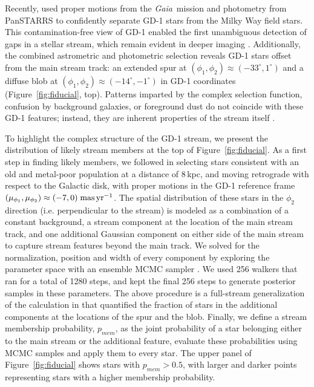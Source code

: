 \documentclass[twocolumn]{aastex62}
\newcommand{\gaia}{\textsl{Gaia}}
\begin{document}
Recently, \citet{pwb} used proper motions from the \gaia\ mission \citep{gdr2} and photometry from PanSTARRS \citep{ps} to confidently separate GD-1 stars from the Milky Way field stars.
This contamination-free view of GD-1 enabled the first unambiguous detection of gaps in a stellar stream, which remain evident in deeper imaging \citep{deboer2018}.
Additionally, the combined astrometric and photometric selection reveals GD-1 stars offset from the main stream track: an extended spur at $(\phi_1, \phi_2)\approx(-33^\circ,1^\circ)$ and a diffuse blob at $(\phi_1, \phi_2)\approx(-14^\circ,-1^\circ)$ in GD-1 coordinates (Figure~\ref{fig:fiducial}, top).
Patterns imparted by the complex selection function, confusion by background galaxies, or foreground dust do not coincide with these GD-1 features; instead, they are inherent properties of the stream itself \citep{pwb}.

To highlight the complex structure of the GD-1 stream, we present the distribution of likely stream members at the top of Figure~\ref{fig:fiducial}.
As a first step in finding likely members, we followed \citet{pwb} in selecting stars consistent with an old and metal-poor population at a distance of 8\,kpc, and moving retrograde with respect to the Galactic disk, with proper motions in the GD-1 reference frame $(\mu_{\phi_1}, \mu_{\phi_2})\approx(-7,0)\;\rm mas\,yr^{-1}$.
The spatial distribution of these stars in the $\phi_2$ direction (i.e. perpendicular to the stream) is modeled as a combination of a constant background, a stream component at the location of the main stream track, and one additional Gaussian component on either side of the main stream to capture stream features beyond the main track.
We solved for the normalization, position and width of every component by exploring the parameter space with an ensemble MCMC sampler \citep{Foreman-Mackey:2013}.
We used 256 walkers that ran for a total of 1280 steps, and kept the final 256 steps to generate posterior samples in these parameters.
The above procedure is a full-stream generalization of the calculation in \citep{pwb} that quantified the fraction of stars in the additional components at the locations of the spur and the blob.
Finally, we define a stream membership probability, $p_{mem}$, as the joint probability of a star belonging either to the main stream or the additional feature, evaluate these probabilities using MCMC samples and apply them to every star.
The upper panel of Figure~\ref{fig:fiducial} shows stars with $p_{mem}>0.5$, with larger and darker points representing stars with a higher membership probability.
\end{document}

